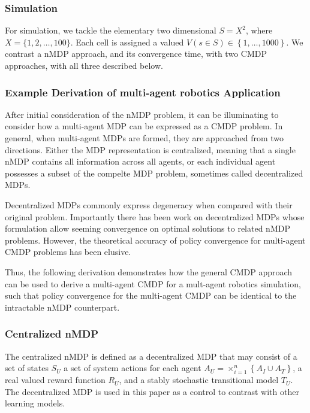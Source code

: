 \documentclass[compsoc,journal,letterpaper,10pt,draftcls,twocolumn]{IEEEtran}
\begin{document}
\subsubsection{Simulation}\label{simulation}

For simulation, we tackle the elementary two dimensional
\(S = X^{2}\), where \(X = \{ 1,2,\ldots,100\}\). Each cell is
assigned a valued
\(V\left( s \in S \right) \in \left\{ 1,\ldots,1000 \right\}\). We
contrast a nMDP approach, and its convergence time, with two CMDP
approaches, with all three described below.

\subsubsection{Example Derivation of multi-agent robotics
Application}\label{example-derivation-of-multi-agent-robotics-application}

After initial consideration of the nMDP problem, it can be illuminating
to consider how a multi-agent MDP can be expressed as a CMDP problem. In
general, when multi-agent MDPs are formed, they are approached from two
directions. Either the MDP representation is centralized, meaning that a
single nMDP contains all information across all agents, or each
individual agent possesses a subset of the compelte MDP problem,
sometimes called decentralized MDPs.

Decentralized MDPs commonly express degeneracy when compared with their
original problem. Importantly there has been work on decentralized MDPs
whose formulation allow seeming convergence on optimal solutions to
related nMDP problems. However, the theoretical accuracy of policy
convergence for multi-agent CMDP problems has been elusive.

Thus, the following derivation demonstrates how the general CMDP
approach can be used to derive a multi-agent CMDP for a mult-agent
robotics simulation, such that policy convergence for the multi-agent
CMDP can be identical to the intractable nMDP counterpart.

\subsubsection{Centralized nMDP}\label{centralized-nmdp}

The centralized nMDP is defined as a decentralized MDP that may consist
of a set of states \(S_{U}\) a set of system actions for each agent
\(A_{U} = \times_{i = 1}^{n}\left\{ A_{I} \cup A_{T} \right\}\), a real
valued reward function \(R_{U}\), and a stably stochastic transitional
model \(T_{U}\). The decentralized MDP is used in this paper as a
control to contrast with other learning models.
\end{document}
